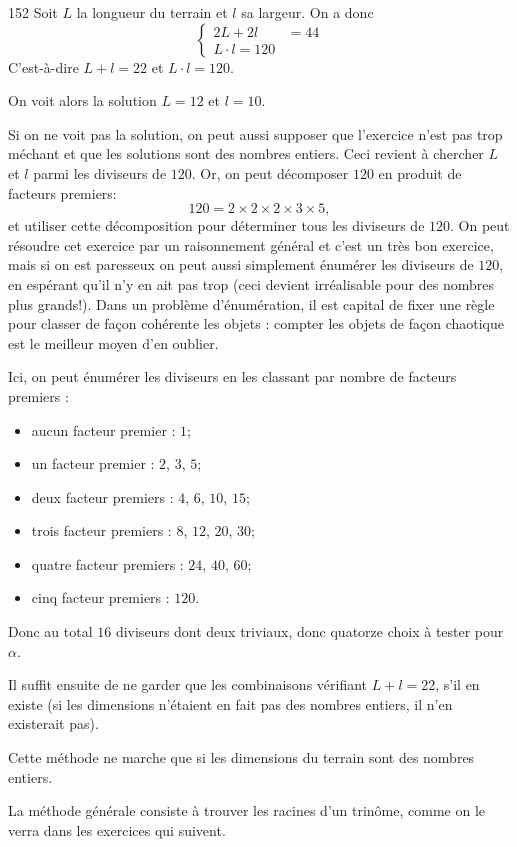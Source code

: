 \begin{Soln}{152}
Soit $L$ la longueur du terrain et $l$ sa largeur. On a donc
\[
\begin{cases}
2L+2l &= 44\\
L\cdot l=120
\end{cases}
\]
C'est-à-dire $L+l=22$ et $L\cdot l=120$.

On \og voit \fg{} alors la solution $L=12$ et $l=10$.

Si on ne voit pas la solution, on peut aussi supposer que l'exercice n'est pas trop méchant et que les solutions sont des nombres entiers. Ceci revient à chercher $L$ et $l$ parmi les diviseurs de $120$. Or, on peut décomposer $120$ en produit de facteurs premiers:
\[ 120 = 2\times 2\times 2 \times 3 \times 5,\]
et utiliser cette décomposition pour déterminer tous les diviseurs de $120$. On peut résoudre cet exercice par un raisonnement général et c'est un très bon exercice, mais si on est paresseux on peut aussi simplement énumérer les diviseurs de $120$, en espérant qu'il n'y en ait pas trop (ceci devient irréalisable pour des nombres plus grands!). Dans un problème d'énumération, il est capital de fixer une règle pour classer de façon cohérente les objets : compter les objets de façon chaotique est le meilleur moyen d'en oublier.

Ici, on peut énumérer les diviseurs en les classant par nombre de facteurs premiers :
\begin{itemize}
\item aucun facteur premier : $1$;
\item un facteur premier : $2$, $3$, $5$;
\item deux facteur premiers : $4$, $6$, $10$, $15$;
\item trois facteur premiers : $8$, $12$, $20$, $30$;
\item quatre facteur premiers : $24$, $40$, $60$;
\item cinq facteur premiers : $120$.
\end{itemize}
Donc au total $16$ diviseurs dont deux triviaux, donc quatorze choix à tester pour $\alpha$.

Il suffit ensuite de ne garder que les combinaisons vérifiant $L+l=22$, s'il en existe (si les dimensions n'étaient en fait pas des nombres entiers, il n'en existerait pas).

Cette méthode ne marche que si les dimensions du terrain sont des nombres entiers.

La méthode générale consiste à trouver les racines d'un trinôme, comme on le verra dans les exercices qui suivent.
\end{Soln}
